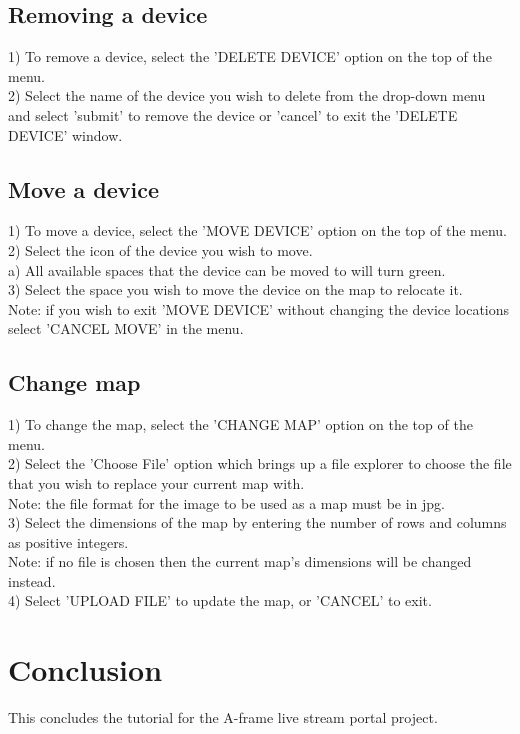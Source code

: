 \documentclass[onecolumn, draftclsnofoot,10pt, compsoc]{IEEEtran}
\begin{document}
\subsection{Removing a device}
1) To remove a device, select the 'DELETE DEVICE' option on the top of the menu. \\
2) Select the name of the device you wish to delete from the drop-down menu and select 'submit' to remove the device or 'cancel' to exit the 'DELETE DEVICE' window.

\subsection{Move a device}
1) To move a device, select the 'MOVE DEVICE' option on the top of the menu. \\
2) Select the icon of the device you wish to move. \\
\hspace*{1cm} a) All available spaces that the device can be moved to will turn green. \\
3) Select the space you wish to move the device on the map to relocate it.
\\
\hspace*{1cm} Note: if you wish to exit 'MOVE DEVICE' without changing the device locations \\
     \hspace*{1.5cm} select 'CANCEL MOVE' in the menu.

\subsection{Change map}
1) To change the map, select the 'CHANGE MAP' option on the top of the menu. \\
2) Select the 'Choose File' option which brings up a file explorer to choose the file that you wish to replace your current map with. \\
\hspace*{1cm} Note: the file format for the image to be used as a map must be in jpg.
\\
3) Select the dimensions of the map by entering the number of rows and columns as positive integers. \\
\hspace*{1cm} Note: if no file is chosen then the current map's dimensions will be changed instead. \\
4) Select 'UPLOAD FILE' to update the map, or 'CANCEL' to exit.

\section{Conclusion}
This concludes the tutorial for the A-frame live stream portal project.
\end{document}
